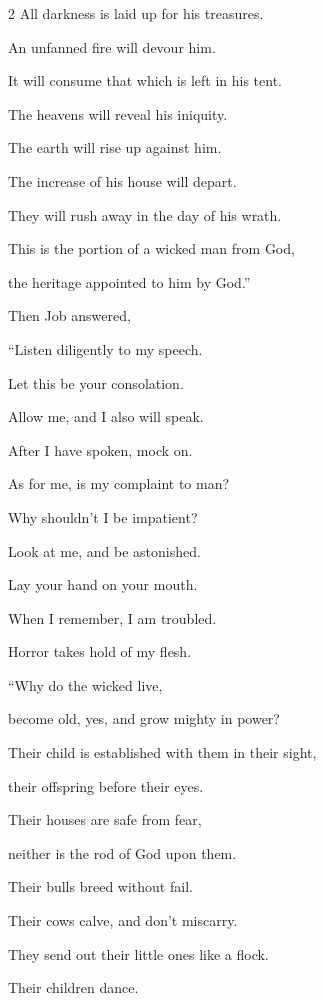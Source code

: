 \begin{multicols}{2}
	\myverse{}All darkness is laid up for his treasures.
	
	An unfanned fire will devour him.
	
	It will consume that which is left in his tent.
	
	\myverse{}The heavens will reveal his iniquity.
	
	The earth will rise up against him.
	
	\myverse{}The increase of his house will depart.
	
	They will rush away in the day of his wrath.
	
	\myverse{}This is the portion of a wicked man from God,
	
	the heritage appointed to him by God.”
	
	
	\mychapter{} \myverse*{}Then Job answered,
	
	\quad\quad \myverse{}“Listen diligently to my speech.
	
	Let this be your consolation.
	
	\myverse{}Allow me, and I also will speak.
	
	After I have spoken, mock on.
	
	\myverse{}As for me, is my complaint to man?
	
	Why shouldn’t I be impatient?
	
	\myverse{}Look at me, and be astonished.
	
	Lay your hand on your mouth.
	
	\myverse{}When I remember, I am troubled.
	
	Horror takes hold of my flesh.
	
	\vspace{\baselineskip}
	
	\myverse{}“Why do the wicked live,
	
	become old, yes, and grow mighty in power?
	
	\myverse{}Their child is established with them in their sight,
	
	their offspring before their eyes.
	
	\myverse{}Their houses are safe from fear,
	
	neither is the rod of God upon them.
	
	\myverse{}Their bulls breed without fail.
	
	Their cows calve, and don’t miscarry.
	
	\myverse{}They send out their little ones like a flock.
	
	Their children dance.
	

\end{multicols}
